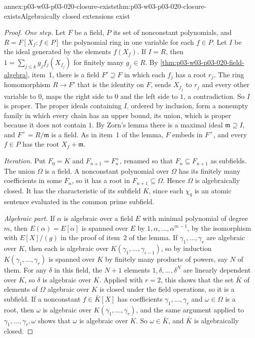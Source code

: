 \begin{annexitem}{annex:p03-w03-p03-020-closure-exists}{thm:p03-w03-p03-020-closure-exists}{Algebraically closed extensions exist}
\begin{proof}
\emph{One step.} Let \(F\) be a field, \(P\) its set of nonconstant
polynomials, and \(R=F[X_f:f\in P]\) the polynomial ring in one variable
for each \(f\in P\). Let \(I\) be the ideal generated by the elements
\(f(X_f)\). If \(I=R\), then \(1=\sum_{j\le k}g_jf_j(X_{f_j})\) for finitely
many \(g_j\in R\). By \cref{thm:p03-w03-p03-020-field-algebra}, item~1,
there is a field \(F'\supseteq F\) in which each \(f_j\) has a root
\(r_j\). The ring homomorphism \(R\to F'\) that is the identity on \(F\),
sends \(X_{f_j}\) to \(r_j\) and every other variable to \(0\), maps the
right side to \(0\) and the left side to \(1\), a contradiction. So \(I\) is
proper. The proper ideals containing \(I\), ordered by inclusion, form a
nonempty family in which every chain has an upper bound, its union, which
is proper because it does not contain \(1\). By Zorn's lemma there is a
maximal ideal \(\mathfrak m\supseteq I\), and \(F^+=R/\mathfrak m\) is a
field. As in item~1 of the lemma, \(F\) embeds in \(F^+\), and every
\(f\in P\) has the root \(X_f+\mathfrak m\).

\emph{Iteration.} Put \(F_0=K\) and \(F_{n+1}=F_n^+\), renamed so that
\(F_n\subseteq F_{n+1}\) as subfields. The union \(\Omega\) is a field. A
nonconstant polynomial over \(\Omega\) has its finitely many coefficients
in some \(F_n\), so it has a root in \(F_{n+1}\subseteq\Omega\). Hence
\(\Omega\) is algebraically closed. It has the characteristic of its
subfield \(K\), since each \(\chi_q\) is an atomic sentence evaluated in
the common prime subfield.

\emph{Algebraic part.} If \(\alpha\) is algebraic over a field \(E\) with
minimal polynomial of degree \(m\), then \(E(\alpha)=E[\alpha]\) is spanned
over \(E\) by \(1,\alpha,\ldots,\alpha^{m-1}\), by the isomorphism with
\(E[X]/(g)\) in the proof of item~2 of the lemma. If
\(\gamma_1,\ldots,\gamma_r\) are algebraic over \(K\), then each is
algebraic over \(K(\gamma_1,\ldots,\gamma_{i-1})\), so by induction
\(K(\gamma_1,\ldots,\gamma_r)\) is spanned over \(K\) by finitely many
products of powers, say \(N\) of them. For any \(\delta\) in this field, the
\(N+1\) elements \(1,\delta,\ldots,\delta^N\) are linearly dependent over
\(K\), so \(\delta\) is algebraic over \(K\). Applied with \(r=2\), this
shows that the set \(\bar K\) of elements of \(\Omega\) algebraic over
\(K\) is closed under the field operations, so it is a subfield. If a
nonconstant \(f\in\bar K[X]\) has coefficients \(\gamma_1,\ldots,\gamma_r\)
and \(\omega\in\Omega\) is a root, then \(\omega\) is algebraic over
\(K(\gamma_1,\ldots,\gamma_r)\), and the same argument applied to
\(\gamma_1,\ldots,\gamma_r,\omega\) shows that \(\omega\) is algebraic over
\(K\). So \(\omega\in\bar K\), and \(\bar K\) is algebraically closed.
\end{proof}
\end{annexitem}

